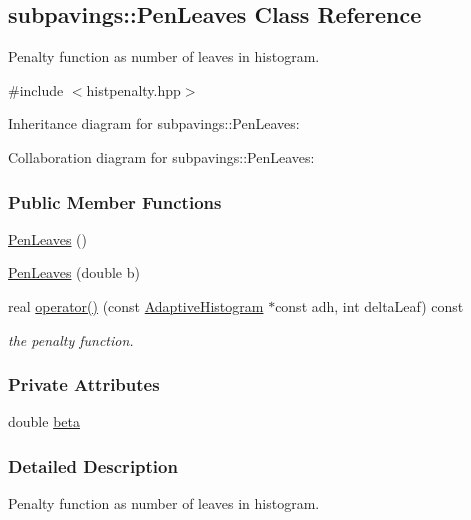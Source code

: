 \hypertarget{classsubpavings_1_1PenLeaves}{\subsection{subpavings\-:\-:\-Pen\-Leaves \-Class \-Reference}
\label{classsubpavings_1_1PenLeaves}
}


\-Penalty function as number of leaves in histogram.  




{\ttfamily \#include $<$histpenalty.\-hpp$>$}



\-Inheritance diagram for subpavings\-:\-:\-Pen\-Leaves\-:


\-Collaboration diagram for subpavings\-:\-:\-Pen\-Leaves\-:
\subsubsection*{\-Public \-Member \-Functions}
\begin{DoxyCompactItemize}
\item 
\hyperlink{classsubpavings_1_1PenLeaves_ad83ee1278a2039ba43faa98bf763a3c1}{\-Pen\-Leaves} ()
\item 
\hyperlink{classsubpavings_1_1PenLeaves_a4859b114078d536cda235038e65a5933}{\-Pen\-Leaves} (double b)
\item 
real \hyperlink{classsubpavings_1_1PenLeaves_a44b8c0386d439fd855c993979dc700b1}{operator()} (const \hyperlink{classsubpavings_1_1AdaptiveHistogram}{\-Adaptive\-Histogram} $\ast$const adh, int delta\-Leaf) const 
\begin{DoxyCompactList}\small\item\em the penalty function. \end{DoxyCompactList}\end{DoxyCompactItemize}
\subsubsection*{\-Private \-Attributes}
\begin{DoxyCompactItemize}
\item 
double \hyperlink{classsubpavings_1_1PenLeaves_ae16bb757e6d5ec3eddfe77d22a8e4b8e}{beta}
\end{DoxyCompactItemize}


\subsubsection{\-Detailed \-Description}
\-Penalty function as number of leaves in histogram. 

